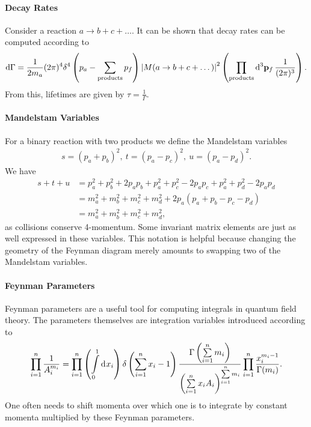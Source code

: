 \paragraph{Decay Rates}
Consider a reaction $a\to b + c + \dots$. It can be shown that decay rates can be computed according to
\begin{align*}
	\dd{\Gamma} = \frac{1}{2m_{a}}(2\pi)^{4}\delta^{4}\left(p_{a} - \sum\limits_{\text{products}}p_{f}\right)\abs{M(a \to b + c + \dots)}^{2}\left(\prod\limits_{\text{products}}\dd[3]{\vb{p}_{f}}\frac{1}{(2\pi)^{3}}\right).
\end{align*}
From this, lifetimes are given by $\tau = \frac{1}{\Gamma}$.

\paragraph{Mandelstam Variables}
For a binary reaction with two products we define the Mandelstam variables
\begin{align*}
	s = (p_{a} + p_{b})^{2},\ t = (p_{a} - p_{c})^{2},\ u = (p_{a} - p_{d})^{2}.
\end{align*}
We have
\begin{align*}
	s + t + u &= p_{a}^{2} + p_{b}^{2} + 2p_{a}p_{b} + p_{a}^{2} + p_{c}^{2} - 2p_{a}p_{c} + p_{a}^{2} + p_{d}^{2} - 2p_{a}p_{d} \\
	          &= m_{a}^{2} + m_{b}^{2} + m_{c}^{2} + m_{d}^{2} + 2p_{a}(p_{a} + p_{b} - p_{c} - p_{d}) \\
	          &= m_{a}^{2} + m_{b}^{2} + m_{c}^{2} + m_{d}^{2},
\end{align*}
as collisions conserve 4-momentum. Some invariant matrix elements are just as well expressed in these variables. This notation is helpful because changing the geometry of the Feynman diagram merely amounts to swapping two of the Mandelstam variables.

\paragraph{Feynman Parameters}
Feynman parameters are a useful tool for computing integrals in quantum field theory. The parameters themselves are integration variables introduced according to
\begin{align*}
	\prod\limits_{i = 1}^{n}\frac{1}{A_{i}^{m_{i}}} = \prod\limits_{i = 1}^{n}\left(\int\limits_{0}^{1}\dd[]{x_{i}}\right)\delta\left(\sum\limits_{i = 1}^{n}x_{i} - 1\right)\frac{\Gamma\left(\sum\limits_{i = 1}^{n}m_{i}\right)}{\left(\sum\limits_{i = 1}^{n}x_{i}A_{i}\right)^{\sum\limits_{i = 1}^{n}m_{i}}}\prod\limits_{i = 1}^{n}\frac{x_{i}^{m_{i} - 1}}{\Gamma(m_{i})}.
\end{align*}
One often needs to shift momenta over which one is to integrate by constant momenta multiplied by these Feynman parameters.

